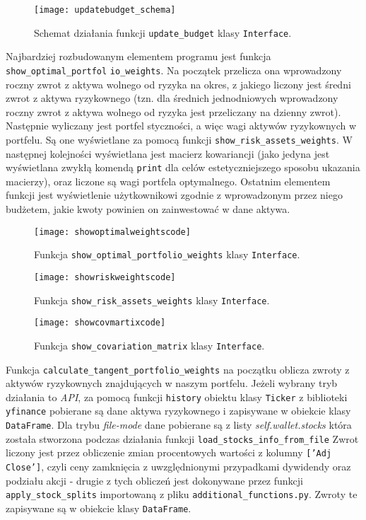 \documentclass[magister]{dyplom}
\def\code#1{\texttt{#1}}
\begin{document}
\begin{figure}[ht!]
	\centering
	\texttt{[image: updatebudget\_schema]}
	\caption{Schemat działania funkcji \code{update\_budget} klasy \code{Interface}.}
\end{figure}

\newpage
Najbardziej rozbudowanym elementem programu jest funkcja \code{show\_optimal\_portfol} \code{io\_weights}. Na początek przelicza ona wprowadzony roczny zwrot z aktywa wolnego od ryzyka na okres, z jakiego liczony jest średni zwrot z aktywa ryzykownego (tzn. dla średnich jednodniowych wprowadzony roczny zwrot z aktywa wolnego od ryzyka jest przeliczany na dzienny zwrot). Następnie wyliczany jest portfel styczności, a więc wagi aktywów ryzykownych w portfelu. Są one wyświetlane za pomocą funkcji \code{show\_risk\_assets\_weights}. W następnej kolejności wyświetlana jest macierz kowariancji (jako jedyna jest wyświetlana zwykłą komendą \code{print} dla celów estetyczniejszego sposobu ukazania macierzy), oraz liczone są wagi portfela optymalnego. Ostatnim elementem funkcji jest wyświetlenie użytkownikowi zgodnie z wprowadzonym przez niego budżetem, jakie kwoty powinien on zainwestować w dane aktywa.

\begin{figure}[ht!]
	\centering
	\texttt{[image: showoptimalweightscode]}
	\caption{Funkcja \code{show\_optimal\_portfolio\_weights} klasy \code{Interface}.}
\end{figure}

\begin{figure}[ht!]
	\centering
	\texttt{[image: showriskweightscode]}
	\caption{Funkcja \code{show\_risk\_assets\_weights} klasy \code{Interface}.}
\end{figure}

\begin{figure}[ht!]
	\centering
	\texttt{[image: showcovmartixcode]}
	\caption{Funkcja \code{show\_covariation\_matrix} klasy \code{Interface}.}
\end{figure}
\newpage
Funkcja \code{calculate\_tangent\_portfolio\_weights} na początku oblicza zwroty z aktywów ryzykownych znajdujących w naszym portfelu. Jeżeli wybrany tryb działania to \textit{API}, za pomocą funkcji \code{history} obiektu klasy \code{Ticker} z biblioteki \code{yfinance} pobierane są dane aktywa ryzykownego i zapisywane w obiekcie klasy \code{DataFrame}. Dla trybu \textit{file-mode} dane pobierane są z listy \textit{self.wallet.stocks} która została stworzona podczas działania funkcji \code{load\_stocks\_info\_from\_file}  Zwrot liczony jest przez obliczenie zmian procentowych wartości z kolumny \code{['Adj Close']}, czyli ceny zamknięcia z uwzględnionymi przypadkami dywidendy oraz podziału akcji - drugie z tych obliczeń jest dokonywane przez funkcji \code{apply\_stock\_splits} importowaną z pliku \code{additional\_functions.py}. Zwroty te zapisywane są w obiekcie klasy \code{DataFrame}.
\end{document}
